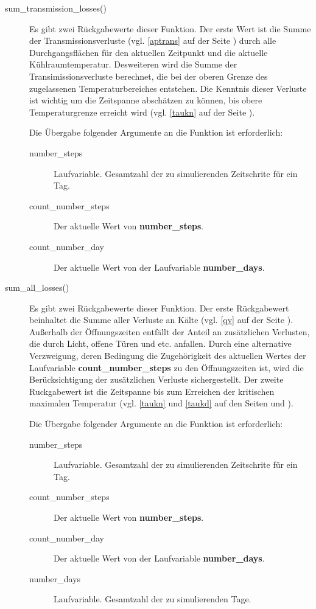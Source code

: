 \begin{description}
	\item[sum\_transmission\_losses()] Es gibt zwei R\"uckgabewerte dieser
	Funktion. Der erste Wert ist die Summe der Transmissionsverluste (vgl.
	\cref{aptrans} auf der Seite \pageref{ptrans}) durch alle
	Durchgangsfl\"achen f\"ur den aktuellen Zeitpunkt und die aktuelle
	K\"uhlraumtemperatur. Desweiteren wird die Summe der
	Transimissionsverluste berechnet, die bei der oberen Grenze des
	zugelassenen Temperaturbereiches entstehen. Die Kenntnis dieser Verluste
	ist wichtig um die Zeitspanne absch\"atzen zu k\"onnen, bis obere
	Temperaturgrenze erreicht wird (vgl. \cref{taukn} auf der Seite
	\pageref{taukn}).

	Die \"Ubergabe folgender Argumente an die Funktion ist erforderlich:
	\begin{description}
		\item[number\_steps] Laufvariable. Gesamtzahl der zu
		simulierenden Zeitschrite f\"ur ein Tag.
		\item[count\_number\_steps] Der aktuelle Wert von
		\textbf{number\_steps}.
		\item[count\_number\_day] Der aktuelle Wert von der Laufvariable
		\textbf{number\_days}.
	\end{description}

	\item[sum\_all\_losses()] Es gibt zwei R\"uckgabewerte dieser Funktion.
	Der erste R\"uckgabewert beinhaltet die Summe aller Verluste an K\"alte
	(vgl. \cref{qv} auf der Seite \pageref{qv}).
	Au\ss erhalb der \"Offnungszeiten entf\"allt der Anteil an
	zus\"atzlichen Verlusten, die durch Licht, offene T\"uren und etc.
	anfallen. Durch eine alternative Verzweigung, deren Bedingung die
	Zugeh\"origkeit des aktuellen Wertes der Laufvariable
	\textbf{count\_number\_steps} zu den \"Offnungszeiten ist, wird die
	Ber\"ucksichtigung der zus\"atzlichen Verluste sichergestellt. Der
	zweite Ruckgabewert ist die Zeitspanne bis zum Erreichen der kritischen
	maximalen Temperatur (vgl. \cref{taukn} und \cref{taukd} auf den Seiten
	\pageref{taukn} und \pageref{taukd}).

	Die \"Ubergabe folgender Argumente an die Funktion ist erforderlich:
	\begin{description}
		\item[number\_steps] Laufvariable. Gesamtzahl der zu
		simulierenden Zeitschrite f\"ur ein Tag.
		\item[count\_number\_steps] Der aktuelle Wert von
		\textbf{number\_steps}.
		\item[count\_number\_day] Der aktuelle Wert von der Laufvariable
		\textbf{number\_days}.
		\item[number\_days] Laufvariable. Gesamtzahl der zu
		simulierenden Tage.
	\end{description}


\end{description}
